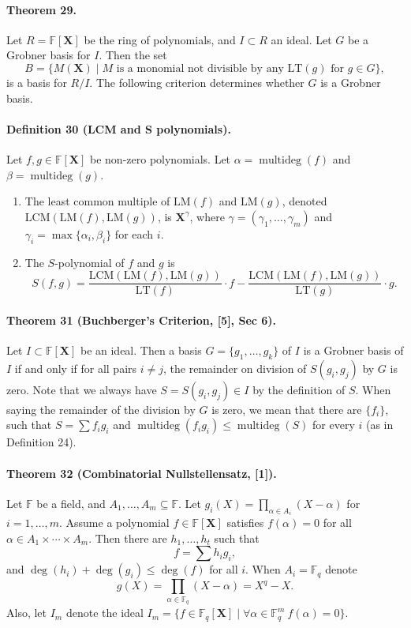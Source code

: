 \paragraph{Theorem 29.} Let $R=\mathbb F[\boldsymbol X]$ be the ring of polynomials, and $I\subset R$ an ideal. Let $G$ be a Grobner basis for $I$. Then the set
\[B=\{M(\boldsymbol X)\mid M\text{ is a monomial not divisible by any }\mathrm{LT}(g)\text{ for }g\in G\},\]
is a basis for $R/I$.
The following criterion determines whether $G$ is a Grobner basis.
\paragraph{Definition 30 (LCM and S polynomials).} Let $f,g\in\mathbb F[\boldsymbol X]$ be non-zero polynomials. Let $\alpha=\operatorname{multideg}(f)$ and $\beta=\operatorname{multideg}(g)$.
\begin{enumerate}
\item The least common multiple of $\mathrm{LM}(f)$ and $\mathrm{LM}(g)$, denoted $\mathrm{LCM}(\mathrm{LM}(f),\mathrm{LM}(g))$, is $\boldsymbol X^\gamma$, where $\gamma=(\gamma_1,\ldots,\gamma_m)$ and $\gamma_i=\max\{\alpha_i,\beta_i\}$ for each $i$.
\item The $S$-polynomial of $f$ and $g$ is
\[S(f,g)=\frac{\mathrm{LCM}(\mathrm{LM}(f),\mathrm{LM}(g))}{\mathrm{LT}(f)}\cdot f-\frac{\mathrm{LCM}(\mathrm{LM}(f),\mathrm{LM}(g))}{\mathrm{LT}(g)}\cdot g.\]
\end{enumerate}
\paragraph{Theorem 31 (Buchberger's Criterion, [5], Sec 6).} Let $I\subset\mathbb F[\boldsymbol X]$ be an ideal. Then a basis $G=\{g_1,\ldots,g_k\}$ of $I$ is a Grobner basis of $I$ if and only if for all pairs $i\neq j$, the remainder on division of $S(g_i,g_j)$ by $G$ is zero.
Note that we always have $S=S(g_i,g_j)\in I$ by the definition of $S$. When saying the remainder of the division by $G$ is zero, we mean that there are $\{f_i\}$, such that $S=\sum f_ig_i$ and $\operatorname{multideg}(f_ig_i)\leq\operatorname{multideg}(S)$ for every $i$ (as in Definition 24).
\paragraph{Theorem 32 (Combinatorial Nullstellensatz, [1]).} Let $\mathbb F$ be a field, and $A_1,\ldots,A_m\subseteq\mathbb F$. Let $g_i(X)=\prod_{\alpha\in A_i}(X-\alpha)$ for $i=1,\ldots,m$. Assume a polynomial $f\in\mathbb F[\boldsymbol X]$ satisfies $f(\alpha)=0$ for all $\alpha\in A_1\times\cdots\times A_m$. Then there are $h_1,\ldots,h_t$ such that
\[f=\sum h_ig_i,\]
and $\deg(h_i)+\deg(g_i)\leq\deg(f)$ for all $i$.
When $A_i=\mathbb F_q$ denote
\[g(X)=\prod_{\alpha\in\mathbb F_q}(X-\alpha)=X^q-X.\]
Also, let $I_m$ denote the ideal $I_m=\{f\in\mathbb F_q[\boldsymbol X]\mid\forall\alpha\in\mathbb F_q^m\ f(\alpha)=0\}$.
